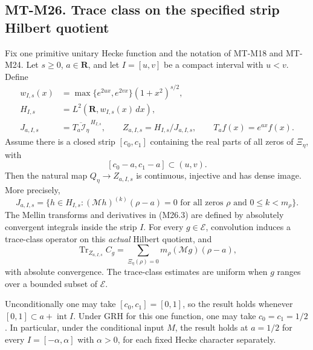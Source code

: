\subsection*{MT-M26. Trace class on the specified strip Hilbert quotient}
Fix one primitive unitary Hecke function and the notation of
MT-M18 and MT-M24. Let $s\ge0$, $a\in\mathbf R$, and let
$I=[u,v]$ be a compact interval with $u<v$. Define
\[
 \begin{split}
 w_{I,s}(x)&=\max\{e^{2ux},e^{2vx}\}(1+x^2)^{s/2},\\
 H_{I,s}&=L^2(\mathbf R,w_{I,s}(x)\,dx),\\
 J_{a,I,s}&=\overline{T_a\mathcal I_\eta}^{\,H_{I,s}},
 \qquad Z_{a,I,s}=H_{I,s}/J_{a,I,s},
 \qquad T_af(x)=e^{ax}f(x).
 \end{split}                                                    \tag{M26.1}
\]
Assume there is a closed strip $[c_0,c_1]$ containing the real
parts of all zeros of $\Xi_\eta$, with
\[
                 [c_0-a,c_1-a]\subset(u,v).
                                                               \tag{M26.2}
\]
Then the natural map $Q_\eta\to Z_{a,I,s}$ is continuous,
injective and has dense image. More precisely,
\[
 J_{a,I,s}
 =\{h\in H_{I,s}:(\mathcal Mh)^{(k)}(\rho-a)=0
       \text{ for all zeros }\rho\text{ and }0\le k<m_\rho\}.
                                                               \tag{M26.3}
\]
The Mellin transforms and derivatives in (M26.3) are defined
by absolutely convergent integrals inside the strip $I$.
For every $g\in\mathcal E$, convolution induces a trace-class
operator on this \emph{actual} Hilbert quotient, and
\[
       \operatorname{Tr}_{Z_{a,I,s}}C_g
          =\sum_{\Xi_\eta(\rho)=0}
                        m_\rho(\mathcal Mg)(\rho-a),
                                                               \tag{M26.4}
\]
with absolute convergence. The trace-class estimates are
uniform when $g$ ranges over a bounded subset of $\mathcal E$.

Unconditionally one may take $[c_0,c_1]=[0,1]$, so the result
holds whenever $[0,1]\subset a+\operatorname{int}I$.
Under GRH for this one function, one may take $c_0=c_1=1/2$.
In particular, under the conditional input $M$, the result
holds at $a=1/2$ for every $I=[-\alpha,\alpha]$ with
$\alpha>0$, for each fixed Hecke character separately.

